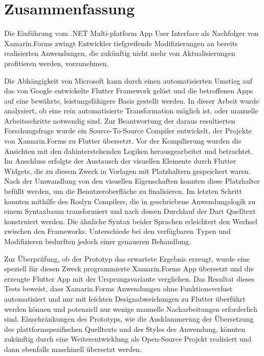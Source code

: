 
\chapter*{Zusammenfassung}
Die Einführung vom .NET Multi-platform App User Interface als Nachfolger von Xamarin.Forms zwingt Entwickler tiefgreifende Modifizierungen an bereits realisierten Anwendungen, die zukünftig nicht mehr von Aktualisierungen profitieren werden, vorzunehmen.

Die Abhängigkeit von Microsoft kann durch einen automatisierten Umstieg auf das von Google entwickelte Flutter Framework gelöst und die betroffenen Apps auf eine bewährte, leistungsfähigere Basis gestellt werden. In dieser Arbeit wurde analysiert, ob eine rein automatisierte Transformation möglich ist, oder manuelle Arbeitsschritte notwendig sind.  Zur Beantwortung der daraus resultierten Forschungsfrage wurde ein Source-To-Source Compiler entwickelt, der Projekte von Xamarin.Forms zu Flutter übersetzt. Vor der  Kompilierung wurden die Ansichten mit den dahinterstehenden Logiken herausgearbeitet und betrachtet.  Im Anschluss erfolgte der Austausch der visuellen Elemente durch Flutter Widgets, die zu diesem Zweck in Vorlagen mit Platzhaltern gespeichert waren. Nach der Umwandlung von den visuellen Eigenschaften konnten diese Platzhalter befüllt werden, um die Benutzeroberfläche zu finalisieren.  Im letzten Schritt konnten mithilfe des Roslyn Compilers, die in \Csharp{} geschriebene Anwendungslogik zu einem Syntaxbaum transformiert und nach dessen Durchlauf der Dart Quelltext konstruiert werden. Die ähnliche Syntax beider Sprachen erleichtert den Wechsel zwischen den Frameworks.  Unterschiede bei den verfügbaren Typen und Modifizieren bedurften jedoch einer genaueren Behandlung.

Zur Überprüfung,  ob der Prototyp das erwartete Ergebnis erzeugt, wurde eine speziell für diesen Zweck programmierte Xamarin.Forms App übersetzt und die erzeugte Flutter App mit der Ursprungsvariante verglichen. Das Resultat dieses Tests beweist, dass Xamarin.Forms Anwendungen ohne Funktionsverlust automatisiert und nur mit leichten Designabweichungen zu Flutter überführt werden können und potenziell nur wenige manuelle Nacharbeitungen erforderlich sind.  Einschränkungen des Prototyps, wie die Ausklammerung der Übersetzung des plattformspezifischen Quelltexts und des Styles der Anwendung, könnten zukünftig durch eine Weiterentwicklung als Open-Source Projekt realisiert und dann ebenfalls maschinell übersetzt werden.


